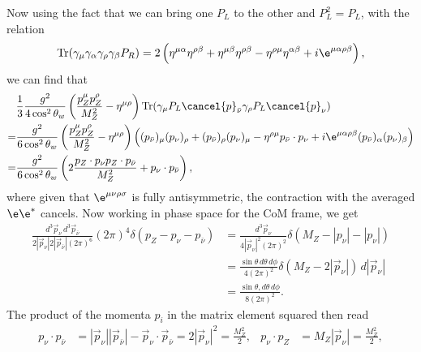 \documentclass[relqm.tex]{subfiles}
\begin{document}
Now using the fact that we can bring one $P_L$ to the other and $P_L^2=P_L$, with the relation
\begin{align}
    \text{Tr}(\gamma_\mu\gamma_\alpha\gamma_\rho\gamma_\beta P_R) = 2\left(\eta^{\mu\alpha}\eta^{\rho\beta}+\eta^{\mu\beta}\eta^{\rho\beta}-\eta^{\rho\mu}\eta^{\alpha\beta}+i\e^{\mu\alpha\rho\beta}\right),
\end{align}
we can find that
\begin{align}
    \begin{split}
        &\frac13 \frac{g^2}{4\cos^2\theta_w}\left(\frac{p_Z^\mu p_Z^\rho}{M_Z^2}-\eta^{\mu\rho}\right)\text{Tr}(\gamma_\mu P_L\cancel{p}_{\bar{\nu}}\gamma_\rho P_L\cancel{p}_\nu) \\
        =&\frac{g^2}{6\cos^2\theta_w}\left(\frac{p_Z^\mu p_Z^\rho}{M_Z^2}-\eta^{\mu\rho}\right)\left((p_{\bar{\nu}})_\mu(p_\nu)_\rho + (p_{\bar{\nu}})_\rho(p_\nu)_\mu - \eta^{\rho\mu}p_{\bar{\nu}}\cdot p_\nu + i\e^{\mu\alpha\rho\beta}(p_{\bar{\nu}})_\alpha(p_\nu)_\beta\right) \\
        =&\frac{g^2}{6\cos^2\theta_w}\left(2\frac{p_Z\cdot p_\nu p_Z\cdot p_{\bar{\nu}}}{M_Z^2} + p_\nu\cdot p_{\bar{\nu}}\right),
    \end{split}
\end{align}
where given that $\e^{\mu\nu\rho\sigma}$ is fully antisymmetric, the contraction with the averaged $\e\e^*$ cancels. 
Now working in phase space for the CoM frame, we get
\begin{align}
    \frac{d^3\vec{p}_\nu\,d^3\vec{p}_{\bar{\nu}}}{2|\vec{p}_\nu|2|\vec{p}_{\bar{\nu}}|(2\pi)^6} (2\pi)^4\delta(p_Z-p_\nu-p_{\bar{\nu}}) &= \frac{d^3\vec{p}_\nu}{4|\vec{p}_\nu|^2(2\pi)^2}\delta(M_Z-|p_\nu|-|p_\nu|) \\
                                                                                                                                        &= \frac{\sin\theta\,d\theta\,d\phi}{4(2\pi)^2}\delta(M_Z-2|\vec{p}_\nu|)\,d|\vec{p}_\nu|\\
                                                                                                                                        &= \frac{\sin\theta,d\theta\,d\phi}{8(2\pi)^2}.
\end{align}
The product of the momenta $p_i$ in the matrix element squared then read
\begin{align}
    p_\nu\cdot p_{\bar{\nu}} &= |\vec{p}_\nu||\vec{p}_{\bar{\nu}}| - \vec{p}_\nu\cdot \vec{p}_{\bar{\nu}} = 2|\vec{p}_\nu|^2 = \frac{M_Z^2}{2}, & p_\nu\cdot p_Z &= M_Z|\vec{p}_\nu| = \frac{M_Z^2}{2},
\end{align}
\end{document}
